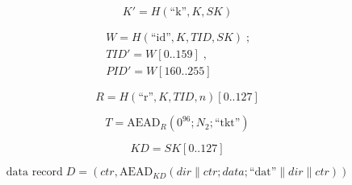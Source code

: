 \par
\begin{equation*}\tag{E7}\label{eq:E7} K' = H(\text{``k''}, K, SK) \end{equation*}
\par
\begin{multline*}\tag{E8}\label{eq:E8} W = H(\text{``id''}, K, TID, SK)\;\text{;} \\ TID' = W[0..159]\;\text{,} \\ PID' = W[160..255] \end{multline*}
\par
\begin{equation*}\tag{E9}\label{eq:E9} R = H(\text{``r''}, K, TID, n)[0..127] \end{equation*}
\par
\begin{equation*}\tag{E10}\label{eq:E10} T = \mathrm{AEAD}_{R}(0^{96}; N_2; \text{``tkt''}) \end{equation*}
\par
\begin{equation*}\tag{E11}\label{eq:E11} KD = SK[0..127] \end{equation*}
\par
\begin{equation*}\tag{E12}\label{eq:E12} \text{data record}\;D = (ctr, \mathrm{AEAD}_{KD}(dir  \|  ctr; data; \text{``dat''}  \|  dir  \|  ctr)) \end{equation*}
\par
